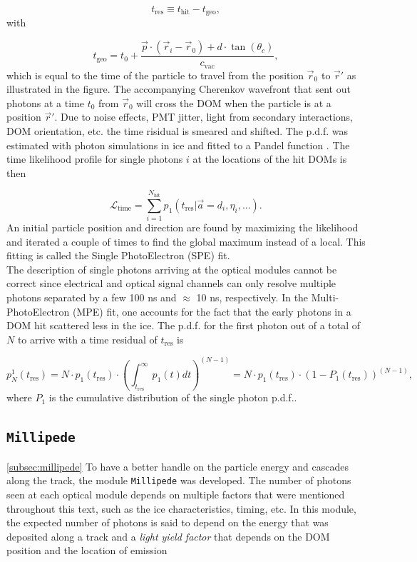 \begin{equation}
t_{\textrm{res}} \equiv t_{\textrm{hit}} - t_{\textrm{geo}},
\end{equation}
\noindent with

\begin{equation}
t_\textrm{geo} = t_0 + \frac{\vec{p} \cdot (\vec{r}_i - \vec{r}_0) + d\cdot \tan (\theta_c)}{c_\textrm{vac}},
\end{equation}
\noindent which is equal to the time of the particle to travel from the position $\vec{r}_0$ to $\vec{r}'$ as illustrated in the figure. The accompanying Cherenkov wavefront that sent out photons at a time $t_0$ from $\vec{r}_0$ will cross the DOM when the particle is at a position $\vec{r}'$. Due to noise effects, PMT jitter, light from secondary interactions, DOM orientation, etc. the time risidual is smeared and shifted. The p.d.f. was estimated with photon simulations in ice and fitted to a Pandel function \cite{Ahrens:2003fg}. The time likelihood profile for single photons $i$ at the locations of the hit DOMs is then

\begin{equation}
\mathcal{L}_\textrm{time} = \sum^{N_\textrm{hit}}_{i=1} p_1 (t_\textrm{res} | \vec{a} = {d_i,\eta_i,...}).
\end{equation}
\noindent An initial particle position and direction are found by maximizing the likelihood and iterated a couple of times to find the global maximum instead of a local. This fitting is called the Single PhotoElectron (SPE) fit.\\

\noindent The description of single photons arriving at the optical modules cannot be correct since electrical and optical signal channels can only resolve multiple photons separated by a few 100 ns and $\approx$ 10 ns, respectively. In the Multi-PhotoElectron (MPE) fit, one accounts for the fact that the early photons in a DOM hit scattered less in the ice. The p.d.f. for the first photon out of a total of $N$ to arrive with a time residual of $t_\textrm{res}$ is

\begin{equation}
p^1_N (t_\textrm{res}) = N \cdot p_1(t_\textrm{res}) \cdot \left(\int^\infty_{t_\textrm{res}} p_1(t) dt \right)^{(N-1)} = N \cdot p_1 (t_\textrm{res}) \cdot (1-P_1 (t_\textrm{res}))^{(N-1)},
\end{equation}
\noindent where $P_1$ is the cumulative distribution of the single photon p.d.f..
\subsection{\texttt{Millipede}}
\ref{subsec:millipede}
To have a better handle on the particle energy and cascades along the track, the module \texttt{Millipede} was developed. The number of photons seen at each optical module depends on multiple factors that were mentioned throughout this text, such as the ice characteristics, timing, etc. In this module, the expected number of photons is said to depend on the energy that was deposited along a track and a \textit{light yield factor} that depends on the DOM position and the location of emission

